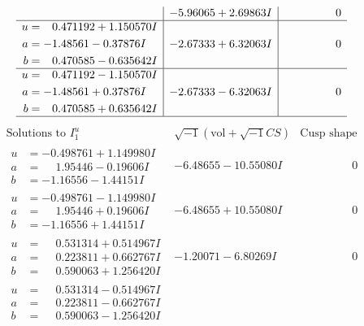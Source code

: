 \documentclass[1p]{elsarticle_modified}
\theoremstyle{definition}
\newcommand{\I}{\sqrt{-1}}
\begin{document}
$$\begin{array}{c|c|c}
 & -5.96065 + 2.69863 I & \phantom{-0.000000 } 0 \\ \hline\begin{aligned}
u &= \phantom{-}0.471192 + 1.150570 I \\
a &= -1.48561 - 0.37876 I \\
b &= \phantom{-}0.470585 - 0.635642 I\end{aligned}
 & -2.67333 + 6.32063 I & \phantom{-0.000000 } 0 \\ \hline\begin{aligned}
u &= \phantom{-}0.471192 - 1.150570 I \\
a &= -1.48561 + 0.37876 I \\
b &= \phantom{-}0.470585 + 0.635642 I\end{aligned}
 & -2.67333 - 6.32063 I & \phantom{-0.000000 } 0\\
 \hline 
 \end{array}$$\newpage$$\begin{array}{c|c|c}  
\text{Solutions to }I^u_{1}& \I (\text{vol} + \sqrt{-1}CS) & \text{Cusp shape}\\
 \hline 
\begin{aligned}
u &= -0.498761 + 1.149980 I \\
a &= \phantom{-}1.95446 - 0.19606 I \\
b &= -1.16556 - 1.44151 I\end{aligned}
 & -6.48655 - 10.55080 I & \phantom{-0.000000 } 0 \\ \hline\begin{aligned}
u &= -0.498761 - 1.149980 I \\
a &= \phantom{-}1.95446 + 0.19606 I \\
b &= -1.16556 + 1.44151 I\end{aligned}
 & -6.48655 + 10.55080 I & \phantom{-0.000000 } 0 \\ \hline\begin{aligned}
u &= \phantom{-}0.531314 + 0.514967 I \\
a &= \phantom{-}0.223811 + 0.662767 I \\
b &= \phantom{-}0.590063 + 1.256420 I\end{aligned}
 & -1.20071 - 6.80269 I & \phantom{-0.000000 } 0 \\ \hline\begin{aligned}
u &= \phantom{-}0.531314 - 0.514967 I \\
a &= \phantom{-}0.223811 - 0.662767 I \\
b &= \phantom{-}0.590063 - 1.256420 I\end{aligned}

\end{array}$$
\end{document}
